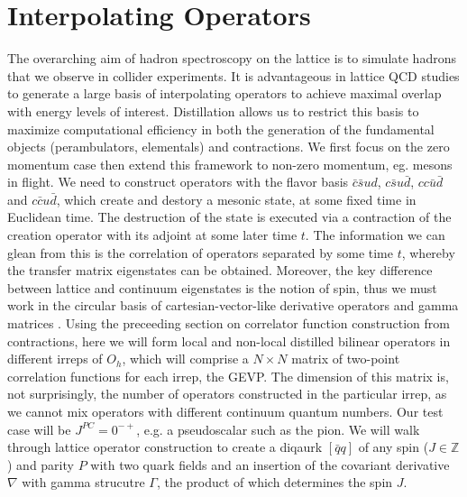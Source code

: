 
\chapter{Interpolating Operators}
\label{sec:ops}

The overarching aim of hadron spectroscopy on the lattice is to simulate hadrons that we observe in collider experiments. It is advantageous in lattice QCD studies to generate a large basis of interpolating operators to achieve maximal overlap with energy levels of interest. Distillation allows us to restrict this basis to maximize computational efficiency in both the generation of the fundamental objects (perambulators, elementals) and contractions. We first focus on the zero momentum case then extend this framework to non-zero momentum, eg. mesons in flight. We need to construct operators with the flavor basis $\bar c\bar s ud$, $c\bar s u\bar d$, $cc\bar u\bar d$ and $c\bar c u\bar d$, which create and destory a mesonic state, at some fixed time in Euclidean time. The destruction of the state is executed via a contraction of the creation operator with its adjoint at some later time $t$.  The information we can glean from this is the correlation of operators separated by some time $t$, whereby the transfer matrix eigenstates can be obtained. Moreover, the key difference between lattice and continuum eigenstates is the notion of spin, thus we must work in the circular basis of cartesian-vector-like derivative operators and gamma matrices \cite{Morningstar:2013bda}. Using the preceeding section on correlator function construction from contractions, here we will form local and non-local distilled bilinear operators in different irreps of $O_h$, which will comprise a $N \times N$ matrix of two-point correlation functions for each irrep, the GEVP. The dimension of this matrix is, not surprisingly, the number of operators constructed in the particular irrep, as we cannot mix operators with different continuum quantum numbers. Our test case will be $J^{PC} =0^{-+}$, e.g. a pseudoscalar such as the pion. We will walk through lattice operator construction to create a diqaurk $[\bar{q}q]$ of any spin ($J \in \mathbb{Z}$) and parity $P$ with two quark fields and an insertion of the covariant derivative $\nabla$ with gamma strucutre $\Gamma$, the product of which determines the spin $J$.  
  

